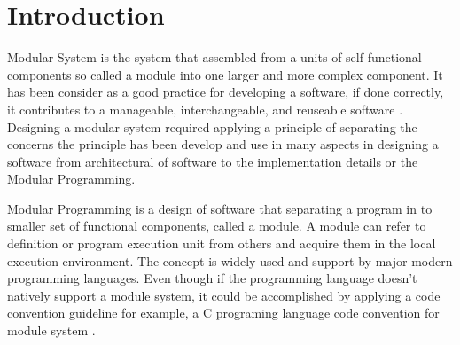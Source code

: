 \chapter*{Introduction}










Modular System is the system that assembled from a units of self-functional components so called a module into one larger and more complex component. It has been consider as a good practice for developing a software, if done correctly, it contributes to a manageable, interchangeable, and reuseable software \cite{MMM}. Designing a modular system required applying a principle of separating the concerns the principle has been develop and use in many aspects in designing a software from architectural of software to the implementation details or the Modular Programming.

Modular Programming is a design of software that separating a program in to smaller set of functional components, called a module. A module can refer to definition or program execution unit from others and acquire them in the local execution environment. The concept is widely used and support by major modern programming languages. Even though if the programming language doesn't natively support a module system, it could be accomplished by applying a code convention guideline for example, a C programing language code convention for module system \cite{staff_2001}. 


